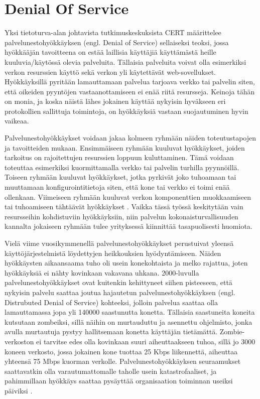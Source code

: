 \section{Denial Of Service}

Yksi tietoturva-alan johtavista tutkimuskeskuksista CERT\cite{cert}
määrittelee palvelunestohyökkäyksen (engl. Denial of Service)
sellaiseksi teoksi, jossa hyökkääjän tavoitteena on estää laillisia
käyttäjiä käyttämästä heille kuuluvia/käytössä olevia
palveluita. Tällaisia palveluita voivat olla esimerkiksi verkon
resurssien käyttö sekä verkon yli käytettävät
web-sovellukset. Hyökkäyksillä pyritään lamauttamaan palvelua tarjoava
verkko tai palvelin siten, että oikeiden pyyntöjen vastaanottamiseen
ei enää riitä resursseja. Keinoja tähän on monia, ja koska näistä
lähes jokainen käyttää nykyisin hyväkseen eri protokollien sallittuja
toimintoja, on hyökkäyksiä vastaan suojautuminen hyvin vaikeaa\cite{hacking}.

Palvelunestohyökkäykset voidaan jakaa kolmeen ryhmään näiden
toteutustapojen ja tavoitteiden mukaan. Ensimmäiseen ryhmään kuuluvat
hyökkäykset, joiden tarkoitus on rajoitettujen resurssien loppuun
kuluttaminen. Tämä voidaan toteuttaa esimerkiksi kuormittamalla verkko
tai palvelin turhilla pyynnöillä. Toiseen ryhmään kuuluvat
hyökkäykset, jotka pyrkivät joko tuhoamaan tai muuttamaan
konfigurointitietoja siten, että kone tai verkko ei toimi enää
ollenkaan. Viimeiseen ryhmään kuuluvat verkon komponenttien
muokkaamiseen tai tuhoamiseen tähtäävät hyökkäykset \cite{cert}. Vaikka tässä
työssä keskitytään vain resursseihin kohdistuviin hyökkäyksiin, niin
palvelun kokonaisturvallisuuden kannalta jokaiseen ryhmään tulee
yrityksessä kiinnittää tasapuolisesti huomiota.

Vielä viime vuosikymmenellä palvelunestohyökkäykset perustuivat
yleensä käyttöjärjestelmistä löydettyjen heikkouksien
hyödyntämiseen. Näiden hyökkäysten aikaansaama tuho oli usein
konekohtaista ja melko rajattua, joten hyökkäyksiä ei nähty kovinkaan
vakavana uhkana. 2000-luvulla palvelunestohyökkäykset ovat kuitenkin
kehittyneet siihen pisteeseen, että nykyisin palvelu saattaa joutua
hajautetun palvelunestohyökkäyksen (engl. Distrubuted Denial of
Service) kohteeksi, jolloin palvelua saattaa olla lamauttamassa jopa
yli 140000 saastunutta konetta. Tällaisia saastuneita koneita
kutsutaan zombeiksi, sillä näihin on murtauduttu ja asennettu
ohjelmisto, jonka avulla murtautuja pystyy hallitsemaan konetta
käyttäjän tietämättä. Zombie-verkoston ei tarvitse edes olla kovinkaan
suuri aiheuttaakseen tuhoa, sillä jo 3000 koneen verkosto, jossa
jokainen kone tuottaa 25 Kbps liikennettä, aiheuttaa yhteensä 75 Mbps
kuorman verkolle\cite{cert}. Palvelunestohyökkäyksen seuraamukset
saattavatkin olla varautumattomalle taholle usein katastrofaaliset, ja
pahimmillaan hyökkäys saattaa pysäyttää organisaation toiminnan
useiksi päiviksi \cite{cert}.

